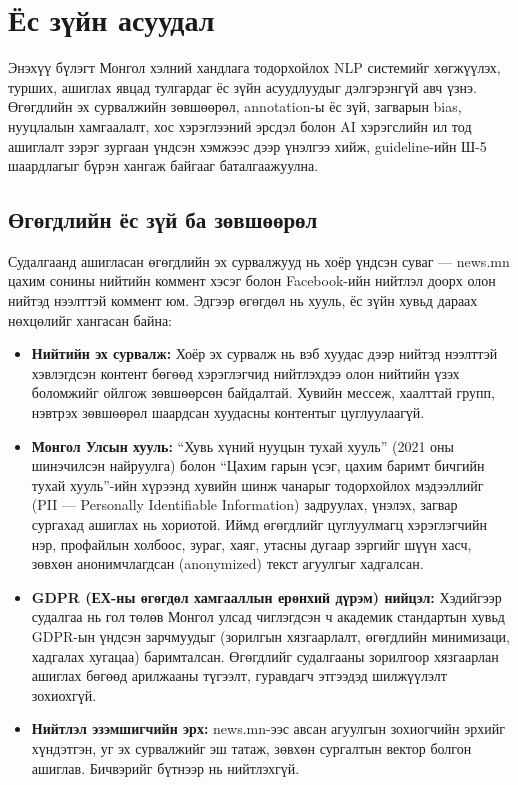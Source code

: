 
\chapter{Ёс зүйн асуудал}
\label{Chapter7}

Энэхүү бүлэгт Монгол хэлний хандлага тодорхойлох NLP системийг хөгжүүлэх,
турших, ашиглах явцад тулгардаг ёс зүйн асуудлуудыг дэлгэрэнгүй авч үзнэ.
Өгөгдлийн эх сурвалжийн зөвшөөрөл, annotation-ы ёс зүй, загварын bias,
нууцлалын хамгаалалт, хос хэрэглээний эрсдэл болон AI хэрэгслийн ил тод
ашиглалт зэрэг зургаан үндсэн хэмжээс дээр үнэлгээ хийж, guideline-ийн Ш-5
шаардлагыг бүрэн хангаж байгааг баталгаажуулна.

\section{Өгөгдлийн ёс зүй ба зөвшөөрөл}

Судалгаанд ашигласан өгөгдлийн эх сурвалжууд нь хоёр үндсэн суваг --- news.mn
цахим сонины нийтийн коммент хэсэг болон Facebook-ийн нийтлэл доорх олон нийтэд
нээлттэй коммент юм. Эдгээр өгөгдөл нь хууль, ёс зүйн хувьд дараах нөхцөлийг
хангасан байна:

\begin{itemize}
  \item \textbf{Нийтийн эх сурвалж:} Хоёр эх сурвалж нь вэб хуудас дээр
    нийтэд нээлттэй хэвлэгдсэн контент бөгөөд хэрэглэгчид нийтлэхдээ олон
    нийтийн үзэх боломжийг ойлгож зөвшөөрсөн байдалтай. Хувийн мессеж,
    хаалттай групп, нэвтрэх зөвшөөрөл шаардсан хуудасны контентыг цуглуулаагүй.
  \item \textbf{Монгол Улсын хууль:} ``Хувь хүний нууцын тухай хууль''
    (2021 оны шинэчилсэн найруулга) болон ``Цахим гарын үсэг, цахим баримт
    бичгийн тухай хууль''-ийн хүрээнд хувийн шинж чанарыг тодорхойлох
    мэдээллийг (PII --- Personally Identifiable Information) задруулах,
    үнэлэх, загвар сургахад ашиглах нь хориотой. Иймд өгөгдлийг цуглуулмагц
    хэрэглэгчийн нэр, профайлын холбоос, зураг, хаяг, утасны дугаар зэргийг
    шүүн хасч, зөвхөн анонимчлагдсан (anonymized) текст агуулгыг хадгалсан.
  \item \textbf{GDPR (ЕХ-ны өгөгдөл хамгааллын ерөнхий дүрэм) нийцэл:} Хэдийгээр
    судалгаа нь гол төлөв Монгол улсад чиглэгдсэн ч академик стандартын
    хувьд GDPR-ын үндсэн зарчмуудыг (зорилгын хязгаарлалт, өгөгдлийн
    минимизаци, хадгалах хугацаа) баримталсан. Өгөгдлийг судалгааны
    зорилгоор хязгаарлан ашиглах бөгөөд арилжааны түгээлт, гуравдагч этгээдэд
    шилжүүлэлт зохиохгүй.
  \item \textbf{Нийтлэл эзэмшигчийн эрх:} news.mn-ээс авсан агуулгын зохиогчийн
    эрхийг хүндэтгэн, уг эх сурвалжийг эш татаж, зөвхөн сургалтын вектор болгон
    ашиглав. Бичвэрийг бүтнээр нь нийтлэхгүй.
\end{itemize}

